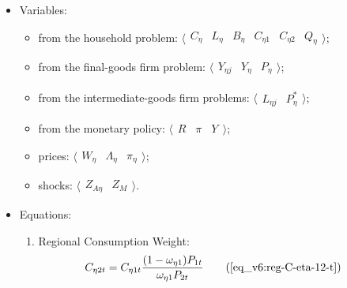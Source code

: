 \documentclass[../thesis.tex]{subfiles}
\begin{document}
{\singlespacing
	
	\begin{itemize}

		\item Variables:
		
	\begin{itemize}
	
		\item from the household problem: $\langle \begin{matrix} C_{\eta } & L_{\eta } & B_{\eta } & C_{\eta 1} & C_{\eta 2} & Q_{\eta } \end{matrix} \rangle$;
		
		\item from the final-goods firm problem: $\langle \begin{matrix} Y_{\eta j} & Y_{\eta } & P_{\eta } \end{matrix} \rangle$;
		
		\item from the intermediate-goods firm problems: $\langle \begin{matrix} L_{\eta j} & P_{\eta }^{\ast} \end{matrix} \rangle$;
		
		\item from the monetary policy: $\langle \begin{matrix} R_{} & \pi_{} & Y_{} \end{matrix} \rangle$;
		
		
		\item prices: $\langle \begin{matrix} W_{\eta } & \Lambda_{\eta } & \pi_{\eta } \end{matrix} \rangle$;
		
		\item shocks: $\langle \begin{matrix} Z_{A\eta } & Z_{M} \end{matrix} \rangle$.

	\end{itemize}

		\item Equations:

	\begin{enumerate}

		\item Regional Consumption Weight:
		\begin{align}
			C_{\eta 2 t} &= C_{\eta 1 t} \frac{(1 - \omega_{\eta 1}) P_{1t}}{\omega_{\eta 1} P_{2t}} \tag{\ref{eq_v6:reg-C-eta-12-t}}
		\end{align}
		

\end{enumerate}
\end{itemize}}
\end{document}

